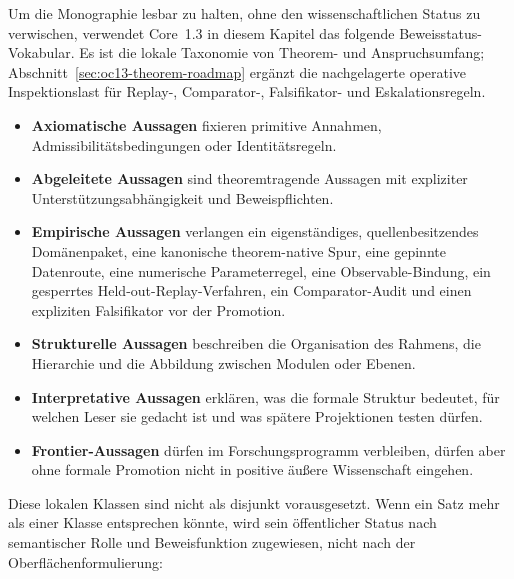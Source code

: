 Um die Monographie lesbar zu halten, ohne den wissenschaftlichen Status zu
verwischen, verwendet Core~1.3 in diesem Kapitel das folgende
Beweisstatus-Vokabular. Es ist die lokale Taxonomie von Theorem- und
Anspruchsumfang; Abschnitt~\ref{sec:oc13-theorem-roadmap} ergänzt die
nachgelagerte operative Inspektionslast für Replay-, Comparator-, Falsifikator-
und Eskalationsregeln.

\begin{itemize}
\item \textbf{Axiomatische Aussagen} fixieren primitive Annahmen,
      Admissibilitätsbedingungen oder Identitätsregeln.
\item \textbf{Abgeleitete Aussagen} sind theoremtragende Aussagen mit expliziter
      Unterstützungsabhängigkeit und Beweispflichten.
\item \textbf{Empirische Aussagen} verlangen ein eigenständiges,
      quellenbesitzendes Domänenpaket, eine kanonische theorem-native Spur,
      eine gepinnte Datenroute, eine numerische Parameterregel, eine
      Observable-Bindung, ein gesperrtes Held-out-Replay-Verfahren, ein
      Comparator-Audit und einen expliziten Falsifikator vor der Promotion.
\item \textbf{Strukturelle Aussagen} beschreiben die Organisation des Rahmens,
      die Hierarchie und die Abbildung zwischen Modulen oder Ebenen.
\item \textbf{Interpretative Aussagen} erklären, was die formale Struktur
      bedeutet, für welchen Leser sie gedacht ist und was spätere Projektionen
      testen dürfen.
\item \textbf{Frontier-Aussagen} dürfen im Forschungsprogramm verbleiben,
      dürfen aber ohne formale Promotion nicht in positive äußere Wissenschaft
      eingehen.
\end{itemize}
Diese lokalen Klassen sind nicht als disjunkt vorausgesetzt. Wenn ein Satz
mehr als einer Klasse entsprechen könnte, wird sein öffentlicher Status nach
semantischer Rolle und Beweisfunktion zugewiesen, nicht nach der
Oberflächenformulierung:
